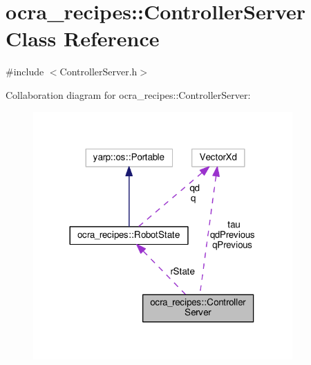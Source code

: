 \hypertarget{classocra__recipes_1_1ControllerServer}{}\section{ocra\+\_\+recipes\+:\+:Controller\+Server Class Reference}
\label{classocra__recipes_1_1ControllerServer}


{\ttfamily \#include $<$Controller\+Server.\+h$>$}



Collaboration diagram for ocra\+\_\+recipes\+:\+:Controller\+Server\+:
\nopagebreak
\begin{figure}[H]
\begin{center}
\leavevmode
\includegraphics[width=281pt]{d7/d59/classocra__recipes_1_1ControllerServer__coll__graph}
\end{center}
\end{figure}
